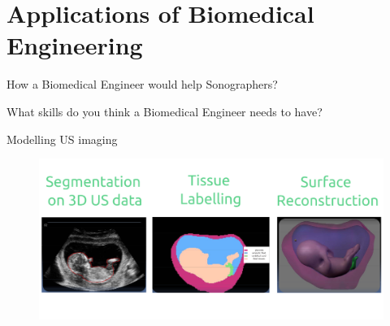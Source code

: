 \section{Applications of Biomedical Engineering}



{
\begin{frame}{}

\BigSizeFont
\begin{center}
    How a Biomedical Engineer would help Sonographers?
\end{center}
\vspace{10mm}
\begin{center}
    What skills do you think a Biomedical Engineer needs to have?
\end{center}

\end{frame}
}


{


\begin{frame}{Modelling US imaging}
      \begin{figure}
        \centering
        \includegraphics[width=1.0\textwidth]{./../figures/modelling-us-imaging/versions/drawing-v03}
      \end{figure}
\end{frame}
}




%
%


